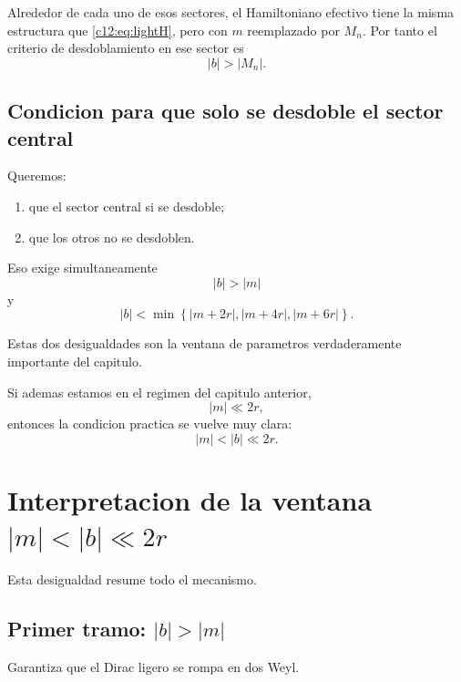 Alrededor de cada uno de esos sectores, el Hamiltoniano efectivo tiene la misma estructura que \eqref{c12:eq:lightH}, pero con \(m\) reemplazado por \(M_n\). Por tanto el criterio de desdoblamiento en ese sector es
\begin{equation}
|b|>|M_n|.
\label{c12:eq:criterionMn}
\end{equation}

\subsection{Condicion para que solo se desdoble el sector central}
Queremos:
\begin{enumerate}[label=\arabic*.]
    \item que el sector central si se desdoble;
    \item que los otros no se desdoblen.
\end{enumerate}

Eso exige simultaneamente
\begin{equation}
|b|>|m|
\label{c12:eq:want1}
\end{equation}
y
\begin{equation}
|b|<
\min\left\{
|m+2r|,
|m+4r|,
|m+6r|
\right\}.
\label{c12:eq:want2}
\end{equation}

Estas dos desigualdades son la ventana de parametros verdaderamente importante del capitulo.

Si ademas estamos en el regimen del capitulo anterior,
\begin{equation}
|m|\ll 2r,
\end{equation}
entonces la condicion practica se vuelve muy clara:
\begin{equation}
\boxed{
|m|<|b|\ll 2r.
}
\label{c12:eq:mainwindow}
\end{equation}

\section{Interpretacion de la ventana \texorpdfstring{\(|m|<|b|\ll 2r\)}{|m|<|b|<<2r}}
Esta desigualdad resume todo el mecanismo.

\subsection{\texorpdfstring{Primer tramo: \(|b|>|m|\)}{Primer tramo: |b|>|m|}}
Garantiza que el Dirac ligero se rompa en dos Weyl.

